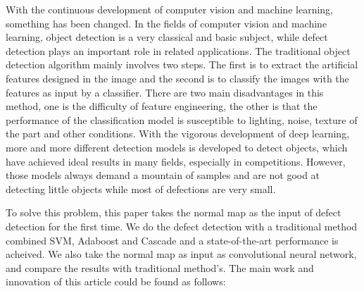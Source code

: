 \begin{englishabstract}

With the continuous development of computer vision and machine learning,
something has been changed.
In the fields of computer vision and machine learning, object detection is a very classical and basic subject, while defect detection plays an important role in related applications. 
The traditional object detection algorithm mainly involves two steps.
The first is to extract the artificial features designed in the image and the second is to classify the images with the features as input by a classifier.
There are two main disadvantages in this method, 
one is the difficulty of feature engineering, 
the other is that the performance of the classification model is susceptible to lighting, noise, texture of the part and other conditions.
With the vigorous development of deep learning, more and more different detection models is developed to detect objects, which have achieved ideal results in many fields, especially in competitions. 
However, those models always demand a mountain of samples and
are not good at detecting little objects while most of defections are very small.

To solve this problem, this paper takes the normal map as the input of defect detection for the first time. We do the defect detection with a traditional method combined SVM, Adaboost and Cascade and a state-of-the-art performance is acheived. We also take the normal map as input as convolutional neural network, and compare the results with traditional method's.
The main work and innovation of this article could be found as follows:


\end{englishabstract}
